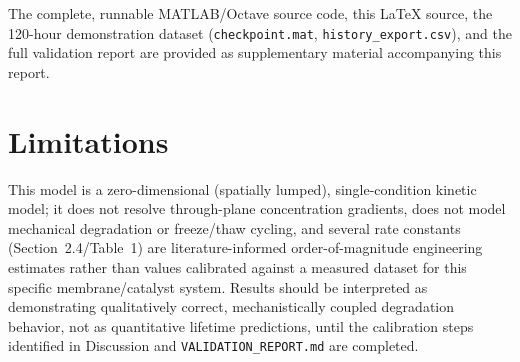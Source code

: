 \documentclass[10pt,twocolumn]{article}
\begin{document}
The complete, runnable MATLAB/Octave source code, this LaTeX source, the
120-hour demonstration dataset (\texttt{checkpoint.mat},
\texttt{history\_export.csv}), and the full validation report are
provided as supplementary material accompanying this report.

\section*{Limitations}
This model is a zero-dimensional (spatially lumped), single-condition
kinetic model; it does not resolve through-plane concentration gradients,
does not model mechanical degradation or freeze/thaw cycling, and several
rate constants (Section~2.4/Table~1) are literature-informed
order-of-magnitude engineering estimates rather than values calibrated
against a measured dataset for this specific membrane/catalyst system.
Results should be interpreted as demonstrating qualitatively correct,
mechanistically coupled degradation behavior, not as quantitative
lifetime predictions, until the calibration steps identified in
Discussion and \texttt{VALIDATION\_REPORT.md} are completed.
\end{document}
